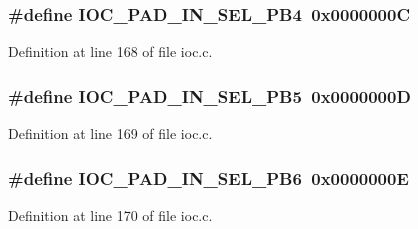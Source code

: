 \subsubsection[{\texorpdfstring{I\+O\+C\+\_\+\+P\+A\+D\+\_\+\+I\+N\+\_\+\+S\+E\+L\+\_\+\+P\+B4}{IOC_PAD_IN_SEL_PB4}}]{\setlength{\rightskip}{0pt plus 5cm}\#define I\+O\+C\+\_\+\+P\+A\+D\+\_\+\+I\+N\+\_\+\+S\+E\+L\+\_\+\+P\+B4~0x0000000C}\hypertarget{group__ioc__api_ga81a0a1663cab5b896204db538e849aa6}{}\label{group__ioc__api_ga81a0a1663cab5b896204db538e849aa6}


Definition at line 168 of file ioc.\+c.

\subsubsection[{\texorpdfstring{I\+O\+C\+\_\+\+P\+A\+D\+\_\+\+I\+N\+\_\+\+S\+E\+L\+\_\+\+P\+B5}{IOC_PAD_IN_SEL_PB5}}]{\setlength{\rightskip}{0pt plus 5cm}\#define I\+O\+C\+\_\+\+P\+A\+D\+\_\+\+I\+N\+\_\+\+S\+E\+L\+\_\+\+P\+B5~0x0000000D}\hypertarget{group__ioc__api_ga453360a0dfa430c65ee4186facf4899c}{}\label{group__ioc__api_ga453360a0dfa430c65ee4186facf4899c}


Definition at line 169 of file ioc.\+c.

\subsubsection[{\texorpdfstring{I\+O\+C\+\_\+\+P\+A\+D\+\_\+\+I\+N\+\_\+\+S\+E\+L\+\_\+\+P\+B6}{IOC_PAD_IN_SEL_PB6}}]{\setlength{\rightskip}{0pt plus 5cm}\#define I\+O\+C\+\_\+\+P\+A\+D\+\_\+\+I\+N\+\_\+\+S\+E\+L\+\_\+\+P\+B6~0x0000000E}\hypertarget{group__ioc__api_ga1936b0a24e93bf593bbe6d346a362b9e}{}\label{group__ioc__api_ga1936b0a24e93bf593bbe6d346a362b9e}


Definition at line 170 of file ioc.\+c.

